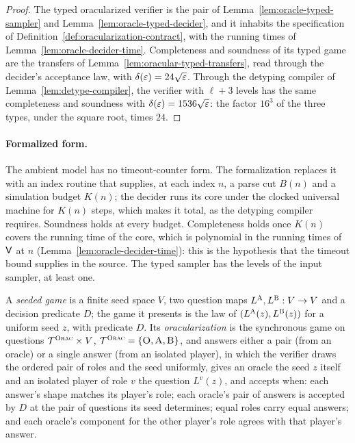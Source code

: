 \begin{proof}
\leanok
The typed oracularized verifier is the pair of Lemma~\ref{lem:oracle-typed-sampler} and
Lemma~\ref{lem:oracle-typed-decider}, and it inhabits the specification of
Definition~\ref{def:oracularization-contract}, with the running times of
Lemma~\ref{lem:oracle-decider-time}. Completeness and soundness of its typed game are the
transfers of Lemma~\ref{lem:oracular-typed-transfers}, read through the decider's acceptance
law, with $\delta(\varepsilon) = 24\sqrt{\varepsilon}$. Through the detyping compiler of
Lemma~\ref{lem:detype-compiler}, the verifier with $\ell + 3$ levels has the same completeness and
soundness with $\delta(\varepsilon) = 1536\sqrt{\varepsilon}$: the factor $16^3$ of the three types, under the
square root, times $24$.
\end{proof}

\paragraph{Formalized form.} The ambient model has no timeout-counter form. The formalization
replaces it with an index routine that supplies, at each index $n$, a parse cut $B(n)$ and a
simulation budget $K(n)$; the decider runs its core under the clocked universal machine for $K(n)$
steps, which makes it total, as the detyping compiler requires. Soundness holds at every budget.
Completeness holds once $K(n)$ covers the running time of the core, which is polynomial in the
running times of $\mathsf{V}$ at $n$ (Lemma~\ref{lem:oracle-decider-time}): this is the hypothesis
that the timeout bound supplies in the source. The typed sampler has the levels of the input
sampler, at least one.

\begin{definition}
\label{def:oracular-game}
\leanok
A \emph{seeded game} is a finite seed space $V$, two question maps $L^{\textsc{A}}, L^{\textsc{B}} : V \to
V$ and a decision predicate $D$; the game it presents is the law of $(L^{\textsc{A}}(z),
L^{\textsc{B}}(z))$ for a uniform seed $z$, with predicate $D$. Its \emph{oracularization} is the
synchronous game on questions $\mathcal{T}^{\textsc{Orac}} \times V$, $\mathcal{T}^{\textsc{Orac}} = \{\textsc{O}, \textsc{A}, \textsc{B}\}$,
and answers either a pair (from an oracle) or a single answer (from an isolated player), in
which the verifier draws the ordered pair of roles and the seed uniformly, gives an oracle the
seed $z$ itself and an isolated player of role $v$ the question $L^v(z)$, and accepts when:
each answer's shape matches its player's role; each oracle's pair of answers is accepted by
$D$ at the pair of questions its seed determines; equal roles carry equal answers; and each
oracle's component for the other player's role agrees with that player's answer.
\end{definition}


